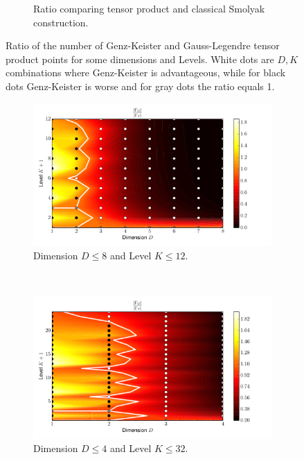\documentclass[a4paper,10pt]{article}
\begin{document}
\begin{figure}
\begin{subfigure}[b]{\linewidth}
    \caption{Ratio comparing tensor product and classical Smolyak construction.}
    \label{fig:smol_legendre_ratio}
  \end{subfigure}
  \caption{Ratio of the number of Genz-Keister and Gauss-Legendre tensor product
  points for some dimensions and Levels.
  White dots are $D,K$ combinations where Genz-Keister is advantageous,
  while for black dots Genz-Keister is worse and for gray dots the ratio equals 1.}
\end{figure}

\begin{figure}
  \begin{subfigure}[b]{\linewidth}
    \centering
    \includegraphics[width=0.8\linewidth]{./img/gk_chebyshevt_ratio.pdf}
    \caption{Dimension $D \leq 8$ and Level $K \leq 12$.}
    \label{fig:gk_chebyshevt_ratio}
  \end{subfigure} \\
  \begin{subfigure}[b]{\linewidth}
    \centering
    \includegraphics[width=0.8\linewidth]{./img/gk_chebyshevt_ratio_large.pdf}
    \caption{Dimension $D \leq 4$ and Level $K \leq 32$.}
    \label{fig:gk_chebyshevt_ratio_large}
  \end{subfigure} \\
  \begin{subfigure}[b]{\linewidth}

\end{subfigure}
\end{figure}
\end{document}
